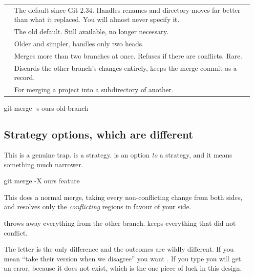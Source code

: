 \documentclass[11pt]{article}
\begin{document}
\vspace{0.5em}
\begin{tabularx}{\linewidth}{@{}L{2.9cm} X@{}}
\toprule
{} &  \\
\midrule
{} & The default since Git 2.34. Handles renames and directory moves far
better than what it replaced. You will almost never specify it. \\
 & The old default. Still available, no longer necessary. \\
 & Older and simpler, handles only two heads. \\
 & Merges more than two branches at once. Refuses if there are
conflicts. Rare. \\
 & Discards the other branch's changes entirely, keeps the merge commit as
a record. \\
 & For merging a project into a subdirectory of another. \\
\bottomrule
\end{tabularx}
\vspace{0.5em}

\begin{shell}
git merge -s ours old-branch
\end{shell}

\subsection{Strategy options, which are different}

This is a genuine trap.  is a strategy.  is an option
\emph{to} a strategy, and it means something much narrower.

\begin{shell}
git merge -X ours feature
\end{shell}

This does a normal merge, taking every non-conflicting change from both sides, and
resolves only the \emph{conflicting} regions in favour of your side.

\begin{trap}
 throws away everything from the other branch.  keeps
everything that did not conflict.

The letter is the only difference and the outcomes are wildly different. If you mean
``take their version when we disagree'' you want . If you type
 you will get an error, because it does not exist, which is the one
piece of luck in this design.
\end{trap}
\end{document}
